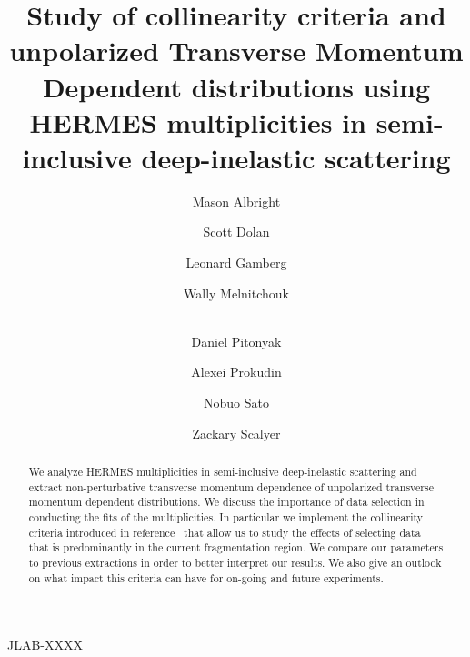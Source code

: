 \documentclass[final,3p,times,onecolumn,sort&compress,hidelinks]{elsarticle}
\newcommand\3[1]{\boldsymbol{#1}}
\newcommand*{\FigPath}{../Figs/}%
\begin{document}
\begin{flushleft}
\end{flushleft}
\vspace{-3.0cm}
\begin{flushright}
JLAB-XXXX
\vspace{0.5cm}
\end{flushright}

\begin{frontmatter}

\author{Mason Albright}
\author{Scott Dolan}
\author{Leonard Gamberg}
\author{Wally Melnitchouk}
\author{\\Daniel Pitonyak}
\author{Alexei Prokudin} 
\author{Nobuo Sato}
\author{Zackary  Scalyer}
\address[label1]{College of Engineering, Penn State University, State College, Pennsylvania 16801, USA}
\address[label4]{Dipartimento di Fisica Teorica, Universit$\grave{a}$ di Torino, Via P. Giuria 1, I-10125 Torino, Italy}
\address[label5]{Dipartimento di Fisica, Universit$\grave{a}$ di Cagliari, Cittadella Universitaria, I-09042 Monserrato
(CA), Italy}
\address[label2]{Division of Science, Penn State University Berks, Reading, Pennsylvania 19610, USA}
\address[label3]{Theory Center, Jefferson Lab, 12000 Jefferson Avenue, Newport News, Virginia 23606, USA}
\address[label4]{?}


\title{Study of collinearity criteria and unpolarized Transverse Momentum Dependent distributions using HERMES multiplicities in semi-inclusive deep-inelastic scattering}


\begin{abstract}
  We analyze HERMES multiplicities in semi-inclusive deep-inelastic scattering and extract non-perturbative transverse momentum dependence of unpolarized transverse momentum dependent distributions. We discuss the importance of data selection in conducting the fits of the multiplicities.  In particular
  we implement   the  collinearity criteria introduced in reference~\cite{Boglione:2016bph} that allow us to study the effects of selecting data
  that is  predominantly in the current fragmentation region.  We compare our parameters to previous extractions in order to better interpret our results.  We also give an outlook on what impact this criteria can have for on-going and future experiments.
\end{abstract}




\end{frontmatter}
\end{document}
